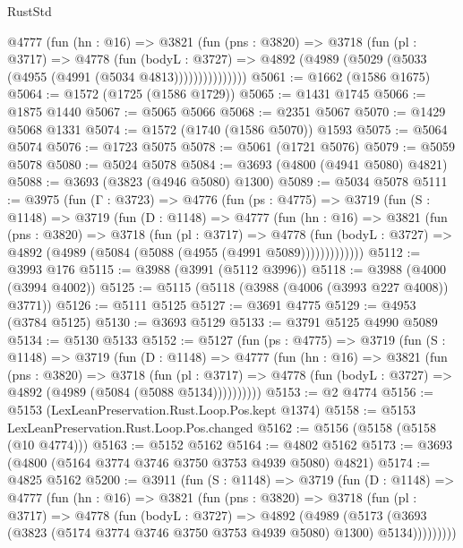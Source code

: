 \begin{lexlean}{RustStd}
\begin{coremodule}
            @4777
              (fun (hn : @16) =>
              @3821
                (fun (pns : @3820) =>
                @3718
                  (fun (pl : @3717) =>
                  @4778
                    (fun (bodyL : @3727) =>
                    @4892 (@4989 (@5029 (@5033 (@4955 (@4991 (@5034 @4813)))))))))))))))
@5061 := @1662 (@1586 @1675)
@5064 := @1572 (@1725 (@1586 @1729))
@5065 := @1431 @1745
@5066 := @1875 @1440
@5067 := @5065 @5066
@5068 := @2351 @5067
@5070 := @1429 @5068 @1331
@5074 := @1572 (@1740 (@1586 @5070)) @1593
@5075 := @5064 @5074
@5076 := @1723 @5075
@5078 := @5061 (@1721 @5076)
@5079 := @5059 @5078
@5080 := @5024 @5078
@5084 := @3693 (@4800 (@4941 @5080) @4821)
@5088 := @3693 (@3823 (@4946 @5080) @1300)
@5089 := @5034 @5078
@5111 := @3975
    (fun (Γ : @3723) =>
    @4776
      (fun (ps : @4775) =>
      @3719
        (fun (S : @1148) =>
        @3719
          (fun (D : @1148) =>
          @4777
            (fun (hn : @16) =>
            @3821
              (fun (pns : @3820) =>
              @3718
                (fun (pl : @3717) =>
                @4778
                  (fun (bodyL : @3727) =>
                  @4892 (@4989 (@5084 (@5088 (@4955 (@4991 @5089)))))))))))))
@5112 := @3993 @176
@5115 := @3988 (@3991 (@5112 @3996))
@5118 := @3988 (@4000 (@3994 @4002))
@5125 := @5115 (@5118 (@3988 (@4006 (@3993 @227 @4008)) @3771))
@5126 := @5111 @5125
@5127 := @3691 @4775
@5129 := @4953 (@3784 @5125)
@5130 := @3693 @5129
@5133 := @3791 @5125 @4990 @5089
@5134 := @5130 @5133
@5152 := @5127
    (fun (ps : @4775) =>
    @3719
      (fun (S : @1148) =>
      @3719
        (fun (D : @1148) =>
        @4777
          (fun (hn : @16) =>
          @3821
            (fun (pns : @3820) =>
            @3718
              (fun (pl : @3717) =>
              @4778 (fun (bodyL : @3727) => @4892 (@4989 (@5084 (@5088 @5134))))))))))
@5153 := @2 @4774
@5156 := @5153 (LexLeanPreservation.Rust.Loop.Pos.kept @1374)
@5158 := @5153 LexLeanPreservation.Rust.Loop.Pos.changed
@5162 := @5156 (@5158 (@5158 (@10 @4774)))
@5163 := @5152 @5162
@5164 := @4802 @5162
@5173 := @3693 (@4800 (@5164 @3774 @3746 @3750 @3753 @4939 @5080) @4821)
@5174 := @4825 @5162
@5200 := @3911
    (fun (S : @1148) =>
    @3719
      (fun (D : @1148) =>
      @4777
        (fun (hn : @16) =>
        @3821
          (fun (pns : @3820) =>
          @3718
            (fun (pl : @3717) =>
            @4778
              (fun (bodyL : @3727) =>
              @4892
                (@4989
                  (@5173
                    (@3693 (@3823 (@5174 @3774 @3746 @3750 @3753 @4939 @5080) @1300) @5134)))))))))

\end{coremodule}
\end{lexlean}
